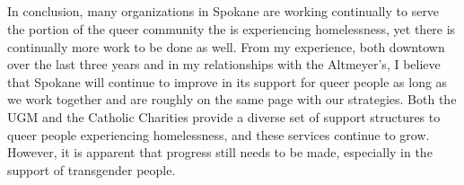     \subsection{}
        In conclusion, many organizations in Spokane are working continually to serve the portion of the queer community the is experiencing homelessness, yet there is continually more work to be done as well.
        From my experience, both downtown over the last three years and in my relationships with the Altmeyer's, I believe that Spokane will continue to improve in its support for queer people as long as we work together and are roughly on the same page with our strategies.
        Both the UGM and the Catholic Charities provide a diverse set of support structures to queer people experiencing homelessness, and these services continue to grow.
        However, it is apparent that progress still needs to be made, especially in the support of transgender people.
